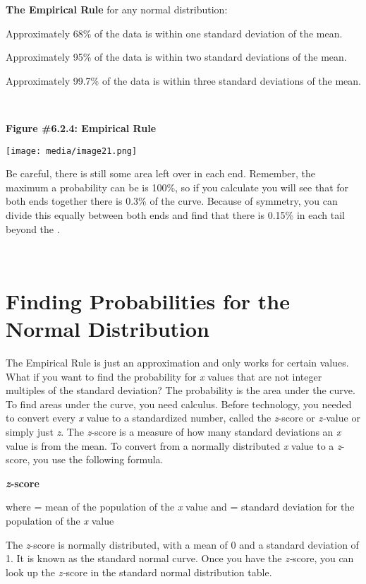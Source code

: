 \documentclass[]{book}
\begin{document}
\textbf{The Empirical Rule} for any normal distribution:

Approximately 68\% of the data is within one standard deviation of the
mean.

Approximately 95\% of the data is within two standard deviations of the
mean.

Approximately 99.7\% of the data is within three standard deviations of
the mean.

\textbf{\\
}

\textbf{Figure \#6.2.4: Empirical Rule}

\texttt{[image: media/image21.png]}

Be careful, there is still some area left over in each end. Remember,
the maximum a probability can be is 100\%, so if you calculate you will
see that for both ends together there is 0.3\% of the curve. Because of
symmetry, you can divide this equally between both ends and find that
there is 0.15\% in each tail beyond the .

\textbf{\\
}

\hypertarget{finding-probabilities-for-the-normal-distribution}{%
\section{Finding Probabilities for the Normal Distribution}\label{finding-probabilities-for-the-normal-distribution}}

The Empirical Rule is just an approximation and only works for certain values. What if you want to find the probability for \emph{x} values that are not integer multiples of the standard deviation? The probability is the area under the curve. To find areas under the curve, you need calculus. Before technology, you needed to convert every \emph{x} value to a standardized number, called the \emph{z}-score or \emph{z-}value or simply just \emph{z}. The \emph{z}-score is a measure of how many standard deviations an \emph{x} value is from the mean. To convert from a normally distributed \emph{x} value to a \emph{z}-score, you use the following formula.

\textbf{\emph{z}-score}

where = mean of the population of the \emph{x} value and = standard deviation for the population of the \emph{x} value

The \emph{z}-score is normally distributed, with a mean of 0 and a standard deviation of 1. It is known as the standard normal curve. Once you have the \emph{z-}score, you can look up the \emph{z-}score in the standard normal distribution table.
\end{document}
